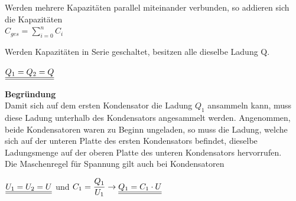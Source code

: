 \beginip
Werden mehrere Kapazitäten parallel miteinander verbunden, so addieren sich die Kapazitäten \\
\formulaBegin
$\displaystyle C_{ges} = \sum_{i=0}^n C_i $
\formulaEnd
\iend

\newpage
{}
\beginip
Werden Kapazitäten in Serie geschaltet, besitzen alle dieselbe Ladung Q.
\begin{center}
	\fix
	 $\displaystyle \underline{\underline{Q_1 = Q_2 = Q}}$
\end{center}
\iend

\textbf{Begründung} \\
Damit sich auf dem ersten Kondensator die Ladung $Q_1$ ansammeln kann, muss diese Ladung unterhalb des Kondensators angesammelt werden. Angenommen, beide Kondensatoren waren zu Beginn ungeladen,
so muss die Ladung, welche sich auf der unteren Platte des ersten Kondensators befindet, dieselbe Ladungsmenge auf der oberen Platte des unteren Kondensators hervorrufen. \\

\beginip
Die Maschenregel für Spannung gilt auch bei Kondensatoren
\begin{center}
	\fix
	$\displaystyle \underline{\underline{U_1 = U_2 = U}} $  und  $\displaystyle C_1 = \frac{Q_1}{U_1} \rightarrow \underline{\underline{Q_1 = C_1 \cdot U}}$
\end{center}
\iend
